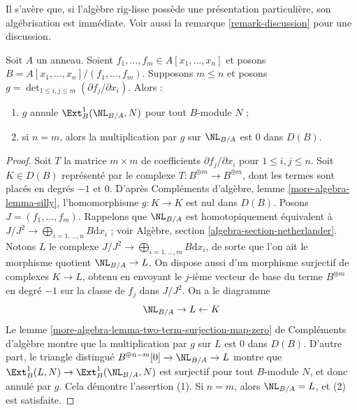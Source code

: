 \noindent
Il s'avère que, si l'algèbre rig-lisse possède une présentation particulière,
son algébrisation est immédiate. Voir aussi la remarque
\ref{remark-discussion} pour une discussion.

\begin{lemma}
\label{lemma-presentation-rig-smooth}
Soit $A$ un anneau. Soient $f_1, \ldots, f_m \in A[x_1, \ldots, x_n]$ et
posons $B = A[x_1, \ldots, x_n]/(f_1, \ldots, f_m)$. Supposons $m \leq n$
et posons $g = \det_{1 \leq i, j \leq m}(\partial f_j/\partial x_i)$. Alors :
\begin{enumerate}
\item $g$ annule $\Ext^1_B(\NL_{B/A}, N)$ pour tout $B$-module $N$ ;
\item si $n = m$, alors la multiplication par $g$ sur $\NL_{B/A}$ est $0$
dans $D(B)$.
\end{enumerate}
\end{lemma}

\begin{proof}
Soit $T$ la matrice $m \times m$ de coefficients
$\partial f_j/\partial x_i$ pour $1 \leq i, j \leq n$. Soit $K \in D(B)$
représenté par le complexe $T : B^{\oplus m} \to B^{\oplus m}$, dont les
termes sont placés en degrés $-1$ et $0$. D'après Compléments d'algèbre, lemme
\ref{more-algebra-lemma-silly}, l'homomorphisme $g : K \to K$ est nul dans
$D(B)$. Posons $J = (f_1, \ldots, f_m)$. Rappelons que $\NL_{B/A}$ est
homotopiquement équivalent à
$J/J^2 \to \bigoplus_{i = 1, \ldots, n} B\text{d}x_i$ ; voir Algèbre,
section \ref{algebra-section-netherlander}. Notons $L$ le complexe
$J/J^2 \to \bigoplus_{i = 1, \ldots, m} B\text{d}x_i$, de sorte que l'on ait
le morphisme quotient $\NL_{B/A} \to L$. On dispose aussi d'un morphisme
surjectif de complexes $K \to L$, obtenu en envoyant le $j$-ième vecteur de
base du terme $B^{\oplus m}$ en degré $-1$ sur la classe de $f_j$ dans
$J/J^2$. On a le diagramme
$$
\NL_{B/A} \to L \leftarrow K
$$
Le lemme \ref{more-algebra-lemma-two-term-surjection-map-zero} de Compléments
d'algèbre montre que la multiplication par $g$ sur $L$ est $0$ dans $D(B)$.
D'autre part, le triangle distingué
$B^{\oplus n - m}[0] \to \NL_{B/A} \to L$ montre que
$\Ext^1_B(L, N) \to \Ext^1_B(\NL_{B/A}, N)$ est surjectif pour tout
$B$-module $N$, et donc annulé par $g$. Cela démontre l'assertion (1). Si
$n = m$, alors $\NL_{B/A} = L$, et (2) est satisfaite.
\end{proof}

